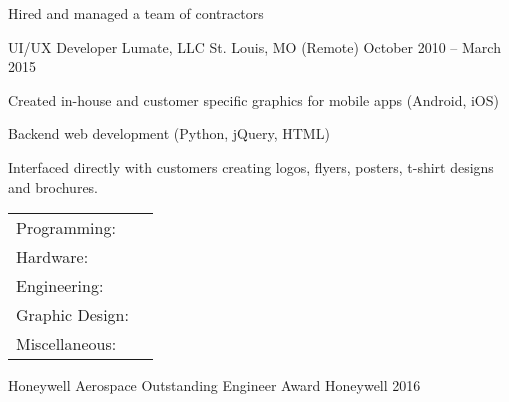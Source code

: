\documentclass[]{awesome-cv}
\begin{document}
\begin{cventries}
{\begin{cvitems}
		\item {Hired and managed a team of contractors}
		\end{cvitems}}
	\cventry
	{UI/UX Developer}
	{Lumate, LLC}
	{St. Louis, MO (Remote)}
	{October 2010 – March 2015}
	{\begin{cvitems}
		\item {Created in-house and customer specific graphics for mobile apps (Android, iOS)}
		\item {Backend web development (Python, jQuery, HTML)}
		\item {Interfaced directly with customers creating logos, flyers, posters, t-shirt designs and brochures.}
		\end{cvitems}}
\end{cventries}
\begin{cventries}
	\cventry
	{}
	{\def\arraystretch{1.15}{\begin{tabular}{ l l }
		Programming:  & {\skill{ VB.NET, Python, Java, MATLAB, Powershell, Github, Subversion, TestStand, Linux, ADB, Visual Studio}} \\
		Hardware:  & {\skill{ Oscilloscopes, DMM, VNA, Raspberry Pi, Arduino}} \\
		Engineering:  & {\skill{ PCB Design, Mentor Graphics, CADSTAR, OrCad, SPICE, EMC/EMI, Solidworks}} \\
		Graphic Design:  & {\skill{ Photoshop, Illustrator}} \\
		Miscellaneous:  & {\skill{ MS Office, MS Project, Excel, Android}} \\
		\end{tabular}}}
	{}
	{}
	{}
\end{cventries}

\vspace{-7mm}

\begin{cvhonors}
	\cvhonor
	{Honeywell Aerospace Outstanding Engineer Award}
	{}
	{Honeywell}
	{2016}
\end{cvhonors}
\ 
\end{document}
